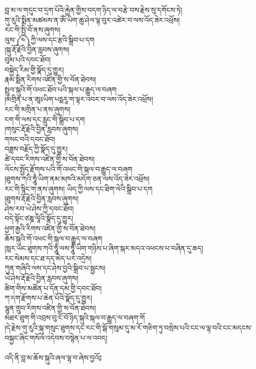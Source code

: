 {\ti བླ་མ་ལ་གདུང་བ་དྲག་པོའི་རྐྱེན་གྱིས་བདག་ཉིད་ལ་བརྩེ་བས་རྗེས་སུ་དགོངས་ཏེ།\\
གུ་རུའི་སྨིན་མཚམས་ན་ཨོཾ་ཡིག་ཆུ་ཤེལ་ལྟ་བུར་འཚེར་བ་ལས་འོད་ཟེར་འཕྲོས།\\
རང་གི་སྤྱི་བོ་ནས་ཞུགས།\\
ལུས་༼༤༽ཀྱི་ལས་དང་རྩའི་སྒྲིབ་པ་དག\\
།སྐུ་རྡོ་རྗེའི་བྱིན་རླབས་ཞུགས།\\
བུམ་པའི་དབང་ཐོབ།\\
བསྐྱེད་རིམ་གྱི་སྣོད་དུ་གྱུར།\\
རྣམ་སྨིན་རིགས་འཛིན་གྱི་ས་བོན་ཐེབས།\\
སྤྲུལ་སྐུའི་གོ་འཕང་ཐོབ་པའི་སྐལ་པ་རྒྱུད་ལ་བཞག\\
།མགྲིན་པ་ན་ཨཱཿཡིག་པདྨརཱ་ག་ལྟར་འབར་བ་ལས་འོད་ཟེར་འཕྲོས།\\
རང་གི་མགྲིན་པ་ནས་ཞུགས།\\
ངག་གི་ལས་དང་རླུང་གི་སྒྲིབ་པ་དག\\
།གསུང་རྡོ་རྗེའི་བྱིན་རླབས་ཞུགས།\\
གསང་བའི་དབང་ཐོབ།\\
བཟླས་བརྗོད་ཀྱི་སྣོད་དུ་གྱུར།\\
ཚེ་དབང་རིགས་འཛིན་གྱི་ས་བོན་ཐེབས།\\
ལོངས་སྤྱོད་རྫོགས་པའི་གོ་འཕང་གི་སྐལ་བ་རྒྱུད་ལ་བཞག\\
།ཐུགས་ཀའི་ཧཱུྃ་ཡིག་ནམ་མཁའི་མདོག་ཅན་ལས་འོད་ཟེར་འཕྲོས།\\
རང་གི་སྙིང་ག་ནས་ཞུགས། ཡིད་ཀྱི་ལས་དང་ཐིག་ལེའི་སྒྲིབ་པ་དག\\
།ཐུགས་རྡོ་རྗེའི་བྱིན་རླབས་ཞུགས།\\
ཤེས་རབ་ཡེ་ཤེས་ཀྱི་དབང་ཐོབ།\\
བདེ་སྟོང་ཙཎྜ་ལཱིའི་སྣོད་དུ་གྱུར།\\
ཕྱག་རྒྱའི་རིགས་འཛིན་གྱི་ས་བོན་ཐེབས།\\
ཆོས་སྐུའི་གོ་འཕང་གི་སྐལ་བ་རྒྱུད་ལ་བཞག\\
།སླར་ཡང་ཐུགས་ཀའི་ཧཱུྃ་ལས་ཧཱུྃ་ཡིག་གཉིས་པ་ཞིག་སྐར་མདའ་འཕངས་པ་བཞིན་དུ་ཆད།\\
རང་སེམས་དང་ཐ་དད་མེད་པར་འདྲེས།\\
ཀུན་གཞིའི་ལས་དང་ཤེས་བྱའི་སྒྲིབ་པ་སྦྱངས།\\
ཡེ་ཤེས་རྡོ་རྗེའི་བྱིན་རླབས་ཞུགས།\\
ཚིག་གིས་མཚོན་པ་དོན་དམ་གྱི་དབང་ཐོབ།\\
ཀ་དག་རྫོགས་པ་ཆེན་པོའི་སྣོད་དུ་གྱུར།\\
ལྷུན་གྲུབ་རིགས་འཛིན་གྱི་ས་བོན་ཐེབས།\\
མཐར་ཐུག་གི་འབྲས་བུ་ངོ་བོ་ཉིད་སྐུའི་སྐལ་བ་རྒྱུད་ལ་བཞག་གོ\\
།དེ་རྗེས་གུ་རུའི་སྐུ་གསུང་ཐུགས་དང་རང་གི་སྒོ་གསུམ་དུ་མ་རོ་གཅིག་ཏུ་བསྲེས་པའི་ངང་ལ་ལྟ་བའི་ངང་མདངས་བསྐྱང་ཞིང་གསོལ་འདེབས་བསྙེན་པ་ལ་འབད།\\
\\
འདི་ནི་བླ་མ་ཆོས་སྐུའི་ཞལ་ལྷ་བ་ཞེས་བྱའོ༔}\\
\\

